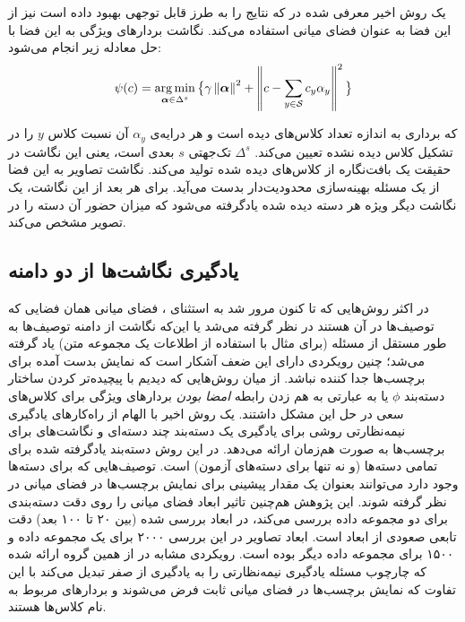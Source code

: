 یک روش اخیر معرفی شده در \cite{ sse} که نتایج را به طرز قابل توجهی بهبود داده است نیز از این فضا به عنوان فضای میانی استفاده می‌کند. نگاشت بردارهای ویژگی به این فضا با حل معادله زیر انجام می‌شود:
\begin{equation}
\psi(c) = \operatorname*{arg\,min}_{ \boldsymbol{\alpha} \in \Delta^{s} } \big \{ \gamma \left \lVert \boldsymbol{\alpha} \right \rVert^2 + \left \lVert c - \sum_{y \in \mathcal{S}} c_y \alpha_y \right \rVert^2 \big \}
\end{equation}

که 
\boldmath{$\alpha$}
برداری به اندازه تعداد کلاس‌های دیده است و هر درایه‌ی $\alpha_y$ آن نسبت کلاس $y$ را در تشکیل کلاس دیده نشده تعیین می‌کند. $\Delta^{s}$ تک‌جهتی 
 $s$
 بعدی  است، یعنی این نگاشت در حقیقت یک بافت‌نگاره 
از کلاس‌های دیده شده تولید می‌کند. نگاشت تصاویر به این فضا از یک مسئله بهینه‌سازی محدودیت‌دار بدست می‌آید. برای هر بعد از این نگاشت، یک نگاشت دیگر ویژه هر دسته دیده شده یادگرفته می‌شود که میزان حضور آن دسته را در تصویر مشخص می‌کند.
\subsection{یادگیری نگاشت‌ها از دو دامنه}\label{joint_embedding}
در اکثر روش‌هایی که تا کنون مرور شد به استثنای ، فضای میانی همان فضایی که توصیف‌ها در آن هستند در نظر گرفته می‌شد یا این‌که نگاشت از دامنه توصیف‌ها به طور مستقل از مسئله (برای مثال با استفاده از اطلاعات یک مجموعه متن) یاد گرفته می‌شد؛ چنین رویکردی دارای این ضعف آشکار است که نمایش بدست آمده برای برچسب‌ها جدا کننده‌
 نباشد. از میان روش‌هایی که دیدیم  \cite{ajoint11, unified13} با پیچیده‌تر کردن ساختار دسته‌بند $\phi$ یا به عبارتی به هم زدن رابطه \emph{ امضا بودن} بردارهای ویژگی برای کلاس‌های سعی در حل این مشکل داشتند. یک روش اخیر \cite{ semi15} با الهام از راه‌کارهای یادگیری نیمه‌نظارتی روشی برای یادگیری  یک دسته‌بند چند دسته‌ای و نگاشت‌های برای برچسب‌ها به صورت هم‌زمان ارائه می‌دهد. در این روش دسته‌بند یادگرفته شده برای تمامی دسته‌ها (و نه تنها برای دسته‌های آزمون) است. توصیف‌هایی که برای دسته‌ها وجود دارد می‌توانند بعنوان یک مقدار پیشینی  برای نمایش برچسب‌ها در فضای میانی در نظر گرفته شوند. این پژوهش هم‌چنین تاثیر ابعاد فضای میانی را روی دقت دسته‌بندی برای دو مجموعه داده بررسی می‌کند، در ابعاد بررسی شده (بین ۲۰ تا ۱۰۰ بعد) دقت تابعی صعودی از ابعاد است. ابعاد تصاویر در این بررسی ۲۰۰۰ برای یک مجموعه داده و ۱۵۰۰ برای مجموعه داده دیگر بوده است.
رویکردی مشابه در \cite{ li15max} از همین گروه ارائه شده که چارچوب مسئله یادگیری نیمه‌نظارتی را به یادگیری از صفر تبدیل می‌کند با این تفاوت که نمایش برچسب‌ها در فضای میانی ثابت فرض می‌شوند و بردارهای مربوط به نام کلاس‌ها هستند. 


